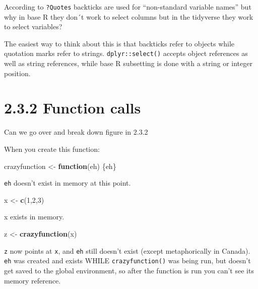 \documentclass[]{book}
\newenvironment{Shaded}{\begin{snugshade}}{\end{snugshade}}
\newcommand{\ControlFlowTok}[1]{\textcolor[rgb]{0.13,0.29,0.53}{\textbf{#1}}}
\newcommand{\DecValTok}[1]{\textcolor[rgb]{0.00,0.00,0.81}{#1}}
\newcommand{\KeywordTok}[1]{\textcolor[rgb]{0.13,0.29,0.53}{\textbf{#1}}}
\newcommand{\NormalTok}[1]{#1}
\newcommand{\StringTok}[1]{\textcolor[rgb]{0.31,0.60,0.02}{#1}}
\begin{document}
According to \texttt{?Quotes} backticks are used for ``non-standard variable names'' but why in base R they don´t work to select columns but in the tidyverse they work to select variables?

The easiest way to think about this is that backticks refer to objects while quotation marks refer to strings. \texttt{dplyr::select()} accepts object references as well as string references, while base R subsetting is done with a string or integer position.

\hypertarget{function-calls}{%
\section*{2.3.2 Function calls}\label{function-calls}}

Can we go over and break down figure in 2.3.2

When you create this function:

\begin{Shaded}
\begin{Highlighting}[]
\NormalTok{crazyfunction <-}\StringTok{ }\ControlFlowTok{function}\NormalTok{(eh) \{eh\}}
\end{Highlighting}
\end{Shaded}

\texttt{eh} doesn't exist in memory at this point.

\begin{Shaded}
\begin{Highlighting}[]
\NormalTok{x <-}\StringTok{ }\KeywordTok{c}\NormalTok{(}\DecValTok{1}\NormalTok{,}\DecValTok{2}\NormalTok{,}\DecValTok{3}\NormalTok{)}
\end{Highlighting}
\end{Shaded}

x exists in memory.

\begin{Shaded}
\begin{Highlighting}[]
\NormalTok{z <-}\StringTok{ }\KeywordTok{crazyfunction}\NormalTok{(x) }
\end{Highlighting}
\end{Shaded}

\texttt{z} now points at \texttt{x}, and \texttt{eh} still doesn't exist (except metaphorically in Canada). \texttt{eh} was created and exists WHILE \texttt{crazyfunction()} was being run, but doesn't get saved to the global environment, so after the function is run you can't see its memory reference.
\end{document}
